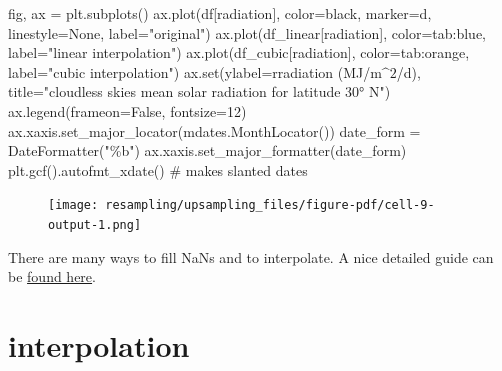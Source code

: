 \documentclass[
  letterpaper,
  DIV=11,
  numbers=noendperiod,
  oneside]{scrreprt}
\newenvironment{Shaded}{\begin{snugshade}}{\end{snugshade}}
\newcommand{\BuiltInTok}[1]{\textcolor[rgb]{0.00,0.23,0.31}{#1}}
\newcommand{\CommentTok}[1]{\textcolor[rgb]{0.37,0.37,0.37}{#1}}
\newcommand{\DecValTok}[1]{\textcolor[rgb]{0.68,0.00,0.00}{#1}}
\newcommand{\NormalTok}[1]{\textcolor[rgb]{0.00,0.23,0.31}{#1}}
\newcommand{\OperatorTok}[1]{\textcolor[rgb]{0.37,0.37,0.37}{#1}}
\newcommand{\StringTok}[1]{\textcolor[rgb]{0.13,0.47,0.30}{#1}}
\newcommand{\VariableTok}[1]{\textcolor[rgb]{0.07,0.07,0.07}{#1}}
\newcommand{\VerbatimStringTok}[1]{\textcolor[rgb]{0.13,0.47,0.30}{#1}}
\begin{document}
\begin{Shaded}
\begin{Highlighting}[]
\NormalTok{fig, ax }\OperatorTok{=}\NormalTok{ plt.subplots()}
\NormalTok{ax.plot(df[}\StringTok{\textquotesingle{}radiation\textquotesingle{}}\NormalTok{], color}\OperatorTok{=}\StringTok{\textquotesingle{}black\textquotesingle{}}\NormalTok{, marker}\OperatorTok{=}\StringTok{\textquotesingle{}d\textquotesingle{}}\NormalTok{, linestyle}\OperatorTok{=}\StringTok{\textquotesingle{}None\textquotesingle{}}\NormalTok{, label}\OperatorTok{=}\StringTok{"original"}\NormalTok{)}
\NormalTok{ax.plot(df\_linear[}\StringTok{\textquotesingle{}radiation\textquotesingle{}}\NormalTok{], color}\OperatorTok{=}\StringTok{\textquotesingle{}tab:blue\textquotesingle{}}\NormalTok{, label}\OperatorTok{=}\StringTok{"linear interpolation"}\NormalTok{)}
\NormalTok{ax.plot(df\_cubic[}\StringTok{\textquotesingle{}radiation\textquotesingle{}}\NormalTok{], color}\OperatorTok{=}\StringTok{\textquotesingle{}tab:orange\textquotesingle{}}\NormalTok{, label}\OperatorTok{=}\StringTok{"cubic interpolation"}\NormalTok{)}
\NormalTok{ax.}\BuiltInTok{set}\NormalTok{(ylabel}\OperatorTok{=}\VerbatimStringTok{r\textquotesingle{}radiation (MJ/m$\^{}2$/d)\textquotesingle{}}\NormalTok{,}
\NormalTok{       title}\OperatorTok{=}\StringTok{"cloudless skies mean solar radiation for latitude 30° N"}\NormalTok{)}
\NormalTok{ax.legend(frameon}\OperatorTok{=}\VariableTok{False}\NormalTok{, fontsize}\OperatorTok{=}\DecValTok{12}\NormalTok{)}
\NormalTok{ax.xaxis.set\_major\_locator(mdates.MonthLocator())}
\NormalTok{date\_form }\OperatorTok{=}\NormalTok{ DateFormatter(}\StringTok{"\%b"}\NormalTok{)}
\NormalTok{ax.xaxis.set\_major\_formatter(date\_form)}
\NormalTok{plt.gcf().autofmt\_xdate()  }\CommentTok{\# makes slanted dates}
\end{Highlighting}
\end{Shaded}

\begin{figure}[H]

{\centering \texttt{[image: resampling/upsampling\_files/figure-pdf/cell-9-output-1.png]}

}

\end{figure}

There are many ways to fill NaNs and to interpolate. A nice detailed
guide can be
\href{https://note.nkmk.me/en/python-pandas-interpolate/}{found here}.

\hypertarget{interpolation-1}{%
\chapter{interpolation}\label{interpolation-1}}
\end{document}
